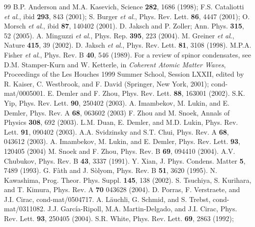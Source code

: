 \documentclass[prl,twocolumn,superscriptaddress,showpacs,floatfix]{revtex4}
\begin{document}
\begin{thebibliography}{99}
	B.P. Anderson and M.A. Kasevich, Science {\bf 282}, 1686 (1998);
	F.S. Cataliotti {\it et al}., ibid {\bf 293}, 843 (2001);
	S. Burger {\it et al}., Phys. Rev. Lett. {\bf 86}, 4447 (2001);
	O. Morsch {\it et al}., ibid {\bf 87}, 140402 (2001).
        D. Jaksch and P. Zoller; Ann. Phys. {\bf 315}, 52 (2005).
	A. Minguzzi {\it et al}.,
	Phys. Rep. {\bf 395}, 223 (2004).
	M. Greiner {\it et al}.,
	Nature {\bf 415}, 39 (2002).
	D. Jaksch {\it et al}.,
	Phys. Rev. Lett. {\bf 81}, 3108 (1998).
	M.P.A. Fisher {\it et al}.,
	Phys. Rev. B {\bf 40}, 546 (1989).
	For a review of spinor condensates, see D.M. Stamper-Kurn and 
	W. Ketterle, in {\it Coherent Atomic Matter Waves},
	Proceedings of the Les Houches 1999 Summer School, Session LXXII,
	edited by R. Kaiser, C. Westbrook, and F. David
	(Springer, New York, 2001); cond-mat/0005001.
	E. Demler and F. Zhou, Phys. Rev. Lett. {\bf 88}, 163001 (2002).
	S.K. Yip, Phys. Rev. Lett. {\bf 90}, 250402 (2003).
	A. Imambekov, M. Lukin, and E. Demler,
	Phys. Rev. A {\bf 68}, 063602 (2003) 
	F. Zhou and M. Snoek, Annals of Physics {\bf 308}, 692 (2003).
	L.M. Duan, E. Demler, and M.D. Lukin,
	Phys. Rev. Lett. {\bf 91}, 090402 (2003).
	A.A. Svidzinsky and S.T. Chui,
	Phys. Rev. A {\bf 68}, 043612 (2003).
	A. Imambekov, M. Lukin, and E. Demler,
	Phys. Rev. Lett. {\bf 93}, 120405 (2004)
	M. Snoek and F. Zhou, Phys. Rev. B {\bf 69}, 094410 (2004). 
        A.V. Chubukov, Phys. Rev. B {\bf 43}, 3337 (1991).
        Y. Xian, J. Phys. Condens. Matter {\bf 5}, 7489 (1993).
        G. F\`ath and J. S\`olyom,
        Phys. Rev. B {\bf 51}, 3620 (1995).
        N. Kawashima, Prog. Theor. Phys. Suppl. {\bf 145}, 138 (2002).
        S. Tsuchiya, S. Kurihara, and T. Kimura,
        Phys. Rev. A {\bf 70} 043628 (2004).
        D. Porras, F. Verstraete, and J.I. Cirac,
        cond-mat/0504717.
        A. L\"auchli, G. Schmid, and S. Trebst,
	cond-mat/0311082.
        J.J. Garc\'ia-Ripoll, M.A. Martin-Delgado, and J.I. Cirac,
	Phys. Rev. Lett. {\bf 93}, 250405 (2004).
        S.R. White, Phys. Rev. Lett. {\bf 69}, 2863 (1992);

\end{thebibliography}
\end{document}
